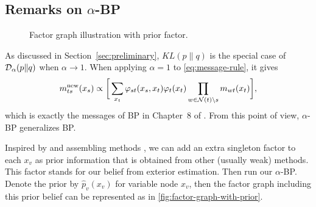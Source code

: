 \documentclass[conference,onecolumn]{IEEEtran}
\begin{document}
\subsection{Remarks on $\alpha$-BP}\label{subsec:remark}
\begin{figure}[!ht]
  \begin{centering}
    \caption{Factor graph illustration with prior factor.}\label{fig:factor-graph-with-prior}
    \vspace{0.1cm}
  \end{centering}
\end{figure}

As discussed in Section~\ref{sec:preliminary}, $KL(p\|q)$ is the special case of $\mathcal{D}_{\alpha}(p\|q)$ when $\alpha \rightarrow 1$. When applying $\alpha=1$ to \autoref{eq:message-rule}, it gives
\begin{equation}
  {m}^{\text{new}}_{ts}(x_s) \propto \bigg[
  \sum_{x_t} \varphi_{st}(x_s, x_t) {\varphi}_t(x_t) \prod_{w\in \mathcal{N}(t)\backslash s}m_{wt}(x_t) \bigg],
\end{equation}
which is exactly the messages of BP in Chapter~$8$ of \cite{Bishop:2006:PRM:1162264}. From this point of view, $\alpha$-BP generalizes BP.

Inspired by \cite{pseudo_priorBP2010} and assembling methods \cite{James:2014:ISL:2517747}, we can add an extra singleton factor to each $x_v$ as prior information that is obtained from other (usually weak) methods. This factor stands for our belief from exterior estimation. Then run our $\alpha$-BP. Denote the prior by $\hat{p}_v(x_v)$ for variable node $x_v$, then the factor graph including this prior belief can be represented as in \autoref{fig:factor-graph-with-prior}.
\end{document}
